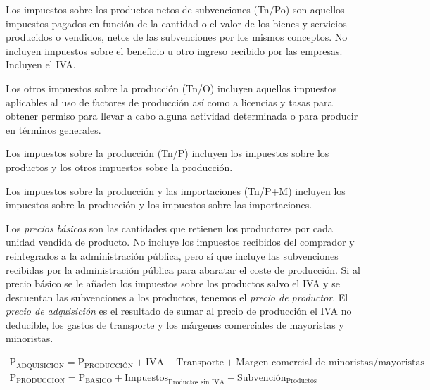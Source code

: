 \documentclass{nuevotema}
\begin{document}
\conceptos



Los impuestos sobre los productos netos de subvenciones (Tn/Po) son aquellos impuestos pagados en función de la cantidad o el valor de los bienes y servicios producidos o vendidos, netos de las subvenciones por los mismos conceptos. No incluyen impuestos sobre el beneficio u otro ingreso recibido por las empresas. Incluyen el IVA.

Los otros impuestos sobre la producción (Tn/O) incluyen aquellos impuestos aplicables al uso de factores de producción así como a licencias y tasas para obtener permiso para llevar a cabo alguna actividad determinada o para producir en términos generales. 

Los impuestos sobre la producción (Tn/P) incluyen los impuestos sobre los productos y los otros impuestos sobre la producción.

Los impuestos sobre la producción y las importaciones (Tn/P+M) incluyen los impuestos sobre la producción y los impuestos sobre las importaciones.


Los \textit{precios básicos} son las cantidades que retienen los productores por cada unidad vendida de producto. No incluye los impuestos recibidos del comprador y reintegrados a la administración pública, pero sí que incluye las subvenciones recibidas por la administración pública para abaratar el coste de producción. Si al precio básico se le añaden los impuestos sobre los productos salvo el IVA y se descuentan las subvenciones a los productos, tenemos el \textit{precio de productor}. El \textit{precio de adquisición} es el resultado de sumar al precio de producción el IVA no deducible, los gastos de transporte y los márgenes comerciales de mayoristas y minoristas.

\begin{align*}
\text{P}_\text{ADQUISICION} = \text{P}_\text{PRODUCCIÓN} + \text{IVA} + \text{Transporte} + \text{Margen comercial de minoristas/mayoristas} \\
\text{P}_\text{PRODUCCION} = \text{P}_\text{BASICO} + \text{Impuestos}_\text{Productos sin IVA} - \text{Subvención}_\text{Productos}
\end{align*}


\preguntas
\end{document}
